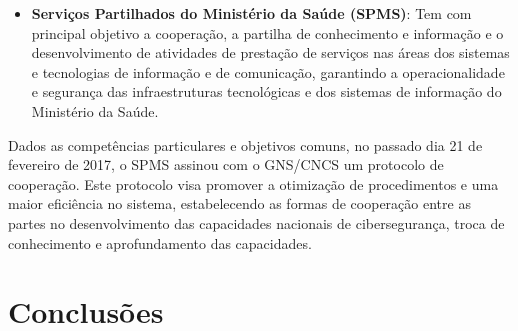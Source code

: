\documentclass{article}
\begin{document}
\begin{multicols}{2}
\begin{itemize}
	\item \textbf{Serviços Partilhados do Ministério da Saúde (SPMS)}: Tem com principal objetivo a cooperação, a partilha de conhecimento e informação e o desenvolvimento de atividades de prestação de serviços nas áreas dos sistemas e tecnologias de informação e de comunicação, garantindo a operacionalidade e segurança das infraestruturas tecnológicas e dos sistemas de informação do Ministério da Saúde.

\end{itemize}

Dados as competências particulares e objetivos comuns, no passado dia 21 de fevereiro de 2017, o SPMS assinou com o GNS/CNCS um protocolo de cooperação. Este protocolo visa promover a otimização de procedimentos e uma maior eficiência no sistema, estabelecendo as formas de cooperação entre as partes no desenvolvimento das capacidades nacionais de cibersegurança, troca de conhecimento e aprofundamento das capacidades.


\section{Conclusões}





\end{multicols}
\end{document}
